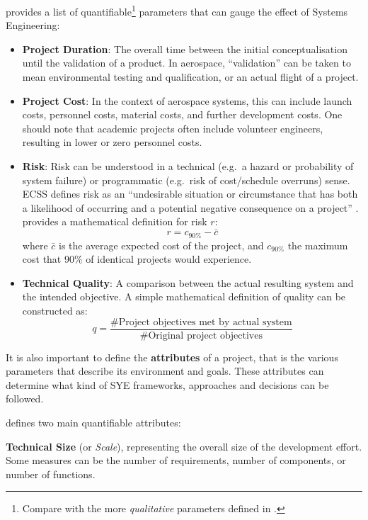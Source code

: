 \documentclass[a4paper,nobib,justified,final]{tufte-book}
\begin{document}
\citeauthor{honourUnderstandingValueSystems2004} \autocite{honourUnderstandingValueSystems2004} provides a list of quantifiable\footnote{Compare with the more \emph{qualitative} parameters defined in .} parameters that can gauge the effect of Systems Engineering:
\begin{itemize}
	\item \textbf{Project Duration}: The overall time between the initial conceptualisation until the validation of a product. In aerospace, ``validation'' can be taken to mean environmental testing and qualification, or an actual flight of a project.
	\item \textbf{Project Cost}: In the context of aerospace systems, this can include launch costs, personnel costs, material costs, and further development costs. One should note that academic projects often include volunteer engineers, resulting in lower or zero personnel costs.
	\item \textbf{Risk}: Risk can be understood in a technical (e.g.~a hazard or probability of system failure) or programmatic (e.g.~risk of cost/schedule overruns) sense.
	\acs{ECSS} defines risk as an ``undesirable situation or circumstance that has both a likelihood of occurring and a potential negative consequence on a project'' \autocite{ECSS-S-ST-00-01C}.
	\citeauthor{honourUnderstandingValueSystems2004} \cite{honourUnderstandingValueSystems2004} provides a mathematical definition for risk \(r\): \[
	r = c_{90\%} - \bar{c}
	\]
	where \( \bar{c} \) is the average expected cost of the project, and \( c_{90\%} \) the maximum cost that 90\% of identical projects would experience.
	\item \textbf{Technical Quality}: A comparison between the actual resulting system and the intended objective.
	A simple mathematical definition of quality can be constructed as: \[
		q = \frac{\text{\# Project objectives met by actual system}}{\text{\# Original project objectives}}
	\]
\end{itemize}

It is also important to define the \textbf{attributes} of a project, that is the various parameters that describe its environment and goals. These attributes can determine what kind of \acs{SYE} frameworks, approaches and decisions can be followed.

\citeauthor{honourUnderstandingValueSystems2004} \autocite{honourUnderstandingValueSystems2004} defines two main quantifiable attributes:
\begin{definition}%
	\textbf{Technical Size} (or \emph{Scale}), representing the overall size of the development effort.
	Some measures can be the number of requirements, number of components, or number of functions.%
\end{definition}
\end{document}
